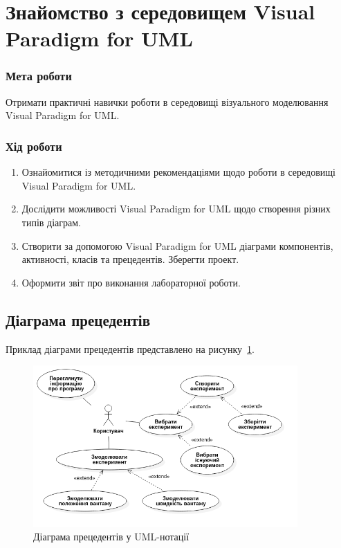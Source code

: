 


\newcommand{\labnumber}{1} %



\usepackage{../packages/tikz-uml}

\graphicspath{{figures/}}


\Ukrainian


\addtocounter{page}{1}

\section*{Знайомство з середовищем Visual Paradigm for UML}
\subsubsection*{Мета роботи}
Отримати практичні навички роботи в середовищі візуального моделювання Visual Paradigm for UML.
\subsubsection*{Хід роботи}
\begin{enumerate}
\item Ознайомитися із методичними рекомендаціями щодо роботи в середовищі Visual Paradigm for UML.
\item Дослідити можливості Visual Paradigm for UML щодо створення різних типів діаграм.
\item Створити за допомогою Visual Paradigm for UML діаграми компонентів, активності, класів та прецедентів. 
Зберегти проект.
\item Оформити звіт про виконання лабораторної роботи.
\end{enumerate}

\subsection{Діаграма прецедентів}
Приклад діаграми прецедентів представлено на рисунку~\ref{fig:uml_usecase}.

\begin{figure}[H]
    \centering
        \includegraphics[width=0.9\textwidth]{uml_usecase}
    \caption{Діаграма прецедентів у UML-нотації}
    \label{fig:uml_usecase}
\end{figure}

